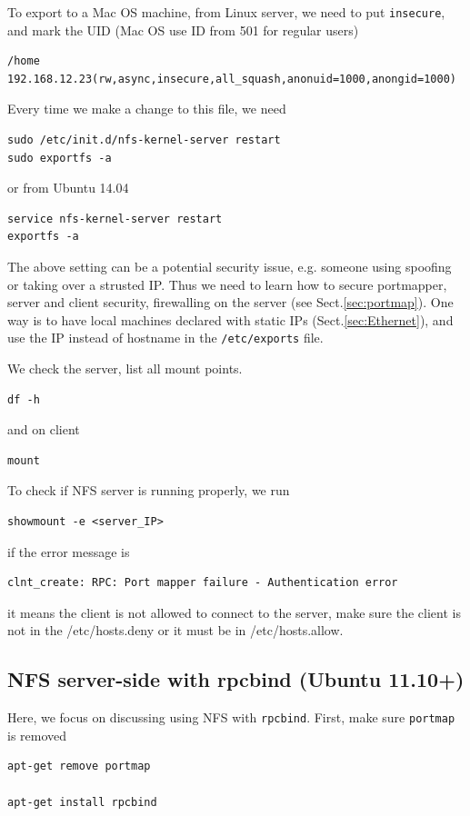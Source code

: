\begin{framed}
To export to a Mac OS machine, from Linux server, we need to put
\verb!insecure!, and mark the UID (Mac OS use ID from 501 for regular users)
{\small \begin{verbatim}
/home 192.168.12.23(rw,async,insecure,all_squash,anonuid=1000,anongid=1000)
\end{verbatim}
}
\end{framed}

Every time we make a change to this file, we need 
\begin{verbatim}
sudo /etc/init.d/nfs-kernel-server restart
sudo exportfs -a
\end{verbatim}
or from Ubuntu 14.04
\begin{verbatim}
service nfs-kernel-server restart
exportfs -a
\end{verbatim}

The above setting can be a potential security issue, e.g. someone using spoofing
or taking over a strusted IP. Thus we need to learn how to secure portmapper,
server and client security, firewalling on the server (see
Sect.\ref{sec:portmap}). One way is to have local machines declared with static
IPs (Sect.\ref{sec:Ethernet}), and use the IP instead of hostname in the
\verb!/etc/exports! file.

We check the server, list all mount points.
\begin{verbatim}
df -h
\end{verbatim}
and on client 
\begin{verbatim}
mount
\end{verbatim}

To check if NFS server is running properly, we run
\begin{verbatim}
showmount -e <server_IP>
\end{verbatim}
if the error message is
\begin{verbatim}
clnt_create: RPC: Port mapper failure - Authentication error
\end{verbatim}
it means the client is not allowed to connect to the server, make sure the
client is not in the /etc/hosts.deny or it must be in /etc/hosts.allow. 

\subsection{NFS server-side with rpcbind (Ubuntu 11.10+)}
\label{sec:nfs_server_rpcbind}

Here, we focus on discussing using NFS with \verb!rpcbind!. First, make sure
\verb!portmap! is removed
\begin{verbatim}
apt-get remove portmap

apt-get install rpcbind
\end{verbatim}

